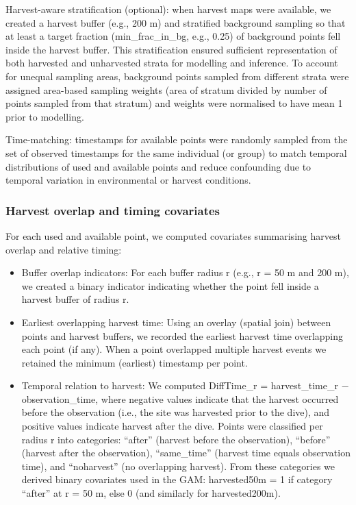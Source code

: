 \documentclass[
  letterpaper,
  DIV=11,
  numbers=noendperiod]{scrartcl}
\begin{document}
Harvest-aware stratification (optional): when harvest maps were
available, we created a harvest buffer (e.g., 200 m) and stratified
background sampling so that at least a target fraction
(min\_frac\_in\_bg, e.g., 0.25) of background points fell inside the
harvest buffer. This stratification ensured sufficient representation of
both harvested and unharvested strata for modelling and inference. To
account for unequal sampling areas, background points sampled from
different strata were assigned area-based sampling weights (area of
stratum divided by number of points sampled from that stratum) and
weights were normalised to have mean 1 prior to modelling.

Time-matching: timestamps for available points were randomly sampled
from the set of observed timestamps for the same individual (or group)
to match temporal distributions of used and available points and reduce
confounding due to temporal variation in environmental or harvest
conditions.

\subsubsection{Harvest overlap and timing
covariates}\label{harvest-overlap-and-timing-covariates}

For each used and available point, we computed covariates summarising
harvest overlap and relative timing:

\begin{itemize}
\item
  Buffer overlap indicators: For each buffer radius r (e.g., r = 50 m
  and 200 m), we created a binary indicator indicating whether the point
  fell inside a harvest buffer of radius r.
\item
  Earliest overlapping harvest time: Using an overlay (spatial join)
  between points and harvest buffers, we recorded the earliest harvest
  time overlapping each point (if any). When a point overlapped multiple
  harvest events we retained the minimum (earliest) timestamp per point.
\item
  Temporal relation to harvest: We computed DiffTime\_r =
  harvest\_time\_r − observation\_time, where negative values indicate
  that the harvest occurred before the observation (i.e., the site was
  harvested prior to the dive), and positive values indicate harvest
  after the dive. Points were classified per radius r into categories:
  ``after'' (harvest before the observation), ``before'' (harvest after
  the observation), ``same\_time'' (harvest time equals observation
  time), and ``noharvest'' (no overlapping harvest). From these
  categories we derived binary covariates used in the GAM: harvested50m
  = 1 if category ``after'' at r = 50 m, else 0 (and similarly for
  harvested200m).
\end{itemize}
\end{document}
